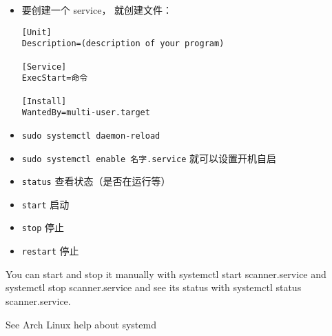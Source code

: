 
\begin{itemize}
\item 要创建一个 service， 就创建文件：
\begin{lstlisting}[language=none,caption=/etc/systemd/system/名字.service]
[Unit]
Description=(description of your program)

[Service]
ExecStart=命令

[Install]
WantedBy=multi-user.target
\end{lstlisting}
\item \verb|sudo systemctl daemon-reload|
\item \verb|sudo systemctl enable 名字.service| 就可以设置开机自启
\item \verb|status| 查看状态（是否在运行等）
\item \verb|start| 启动
\item \verb|stop| 停止
\item \verb|restart| 停止
\end{itemize}

You can start and stop it manually with systemctl start scanner.service and systemctl stop scanner.service and see its status with systemctl status scanner.service.

See Arch Linux help about systemd